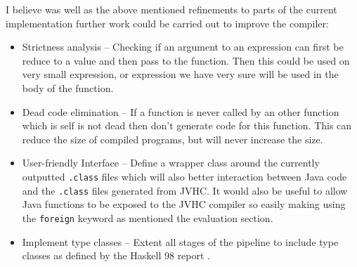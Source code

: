 \documentclass[float=false, crop=false]{standalone}
\begin{document}
I believe was well as the above mentioned refinements to 
parts of the current implementation further work could be carried out 
to improve the compiler:

\begin{itemize}
  \item Strictness analysis -- Checking if an argument to an
    expression can first be reduce to a value and then pass
    to the function. Then this could be used on very small
    expression, or expression we have very sure will be used in the 
    body of the function.

  \item Dead code elimination -- If a function is never
    called by an other function which is self is not dead
    then don't generate code for this function. This can
    reduce the size of compiled programs, but will never
    increase the size.

  \item User-friendly Interface -- Define a wrapper class
    around the currently outputted \verb|.class| files
    which will also better interaction between Java code and the
    \verb|.class| files generated from JVHC. It would also
    be useful to allow Java functions to be exposed to the JVHC 
    compiler so easily making using the \verb|foreign| keyword 
    as mentioned the evaluation section.

  \item Implement type classes -- Extent all stages of the pipeline to 
    include type classes as defined by the Haskell 98 report 
    \cite{haskell98-spec}.
\end{itemize}




\end{document}
